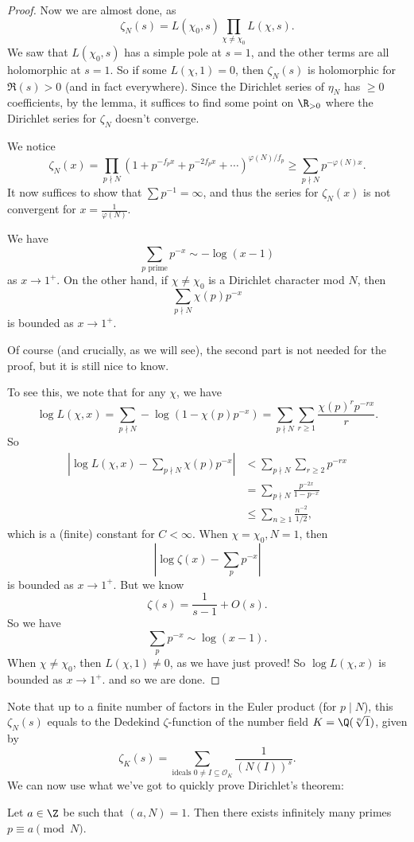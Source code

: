 \documentclass[a4paper]{article}
\begin{document}
\begin{proof}
  Now we are almost done, as
  \[
    \zeta_N(s) = L(\chi_0, s) \prod_{\chi \not= \chi_0} L(\chi, s).
  \]
  We saw that $L(\chi_0, s)$ has a simple pole at $s = 1$, and the other terms are all holomorphic at $s = 1$. So if some $L(\chi, 1) = 0$, then $\zeta_N(s)$ is holomorphic for $\Re(s) > 0$ (and in fact everywhere). Since the Dirichlet series of $\eta_N$ has $\geq 0$ coefficients, by the lemma, it suffices to find some point on $\R_{>0}$ where the Dirichlet series for $\zeta_N$ doesn't converge.

  We notice
  \[
    \zeta_N(x) = \prod_{p \nmid N} (1 + p^{-f_p x} + p^{-2 f_p x} + \cdots)^{\varphi(N)/f_p} \geq \sum_{p \nmid N} p^{- \varphi(N) x}.
  \]
  It now suffices to show that $\sum p^{-1} = \infty$, and thus the series for $\zeta_N(x)$ is not convergent for $x = \frac{1}{\varphi(N)}$.
  \begin{claim}
    We have
    \[
      \sum_{p \text{ prime}} p^{-x} \sim - \log (x - 1)
    \]
    as $x \to 1^+$. On the other hand, if $\chi \not= \chi_0$ is a Dirichlet character mod $N$, then
    \[
      \sum_{p \nmid N} \chi(p) p^{-x}
    \]
    is bounded as $x \to 1^+$.
  \end{claim}
  Of course (and crucially, as we will see), the second part is not needed for the proof, but it is still nice to know.

  To see this, we note that for any $\chi$, we have
  \[
    \log L(\chi, x) = \sum_{p \nmid N} - \log (1 - \chi(p) p^{-x}) = \sum_{p \nmid N} \sum_{r \geq 1} \frac{\chi(p)^r p^{-rx}}{r}.
  \]
  So
  \begin{align*}
    \left|\log L(\chi, x) - \sum_{p \nmid N} \chi(p) p^{-x}\right| &< \sum_{p \nmid N} \sum_{r \geq 2} p^{-rx}\\
    &= \sum_{p \nmid N} \frac{p^{-2x}}{1 - p^{-x}}\\
    &\leq \sum_{n \geq 1} \frac{n^{-2}}{1/2},
  \end{align*}
  which is a (finite) constant for $C < \infty$. When $\chi = \chi_0, N = 1$, then
  \[
    \left|\log \zeta(x) - \sum_p p^{-x}\right|
  \]
  is bounded as $x \to 1^+$. But we know
  \[
    \zeta(s) = \frac{1}{s - 1} + O(s).
  \]
  So we have
  \[
    \sum_p p^{-x} \sim \log (x - 1).
  \]
  When $\chi \not= \chi_0$, then $L(\chi, 1) \not= 0$, as we have just proved! So $\log L(\chi, x)$ is bounded as $x \to 1^+$. and so we are done.
\end{proof}

Note that up to a finite number of factors in the Euler product (for $p \mid N$), this $\zeta_N(s)$ equals to the Dedekind $\zeta$-function of the number field $K = \Q(\sqrt[n]{1})$, given by
\[
  \zeta_K(s) = \sum_{\text{ideals } 0 \not= I \subseteq \mathcal{O}_K} \frac{1}{(N(I))^s}.
\]
We can now use what we've got to quickly prove Dirichlet's theorem:
\begin{thm}
  Let $a \in \Z$ be such that $(a, N) = 1$. Then there exists infinitely many primes $p \equiv a \pmod N$.
\end{thm}
\end{document}
